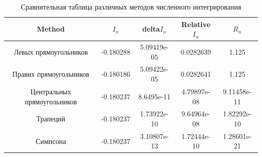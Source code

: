 \documentclass{article}
\begin{document}
\begin{table}[H]
\centering
\begin{tabular}{|c|c|c|c|c|}
\hline
Method & $I_n$ & delta$I_n$ & Relative$I_n$ & $R_n$ \\
\hline
Левых
прямоугольников& -0.180288 & 5.09419e-05 & 0.0282639 & 1.125 \\
Правих
прямоугольников & -0.180186 & 5.09422e-05 & 0.0282641 & 1.125 \\
Центральных
прямоугольников & -0.180237 & 8.6495e-11 & 4.79897e-08 & 9.11458e-11 \\
Трапеций  & -0.180237 & 1.73922e-10 & 9.64964e-08 & 1.82292e-10 \\
Симпсона  & -0.180237 & 3.10807e-13 & 1.72444e-10 & 1.28601e-21 \\
\hline
\end{tabular}
\caption{Сравнительная таблица различных методов численного интегрирования}
\label{tab:my_label_2}
\end{table}
\end{document}
